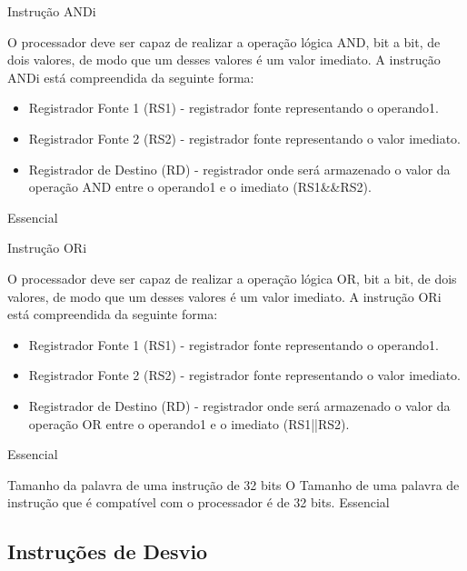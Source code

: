\documentclass{article}
\begin{document}
\begin{functional}
      \requirement
      {Instrução ANDi}
      {O processador deve ser capaz de realizar a operação lógica AND, bit a bit, de dois valores, de modo que um desses valores é um valor imediato.
      A instrução ANDi está compreendida da seguinte forma:\\
       \begin{itemize}
        \item Registrador Fonte 1 (RS1) - registrador fonte representando o operando1.
        \item Registrador Fonte 2 (RS2) - registrador fonte representando o valor imediato.
        \item Registrador de Destino (RD) - registrador onde será armazenado o valor da operação AND entre o operando1 e o imediato (RS1\&\&RS2).
       \end{itemize}
       }
      {Essencial}
      
      \requirement
      {Instrução ORi}
      {O processador deve ser capaz de realizar a operação lógica OR, bit a bit, de dois valores, de modo que um desses valores é um valor imediato.
      A instrução ORi está compreendida da seguinte forma:\\
       \begin{itemize}
        \item Registrador Fonte 1 (RS1) - registrador fonte representando o operando1.
        \item Registrador Fonte 2 (RS2) - registrador fonte representando o valor imediato.
        \item Registrador de Destino (RD) - registrador onde será armazenado o valor da operação OR entre o operando1 e o imediato (RS1||RS2).
       \end{itemize}
       }
      {Essencial}

      \requirement
      {Tamanho da palavra de uma instrução de 32 bits}
      {O Tamanho de uma palavra de instrução que é compatível com o processador é de 32 bits.}
      {Essencial}
\end{functional}
    \subsection{Instruções de Desvio}
\end{document}
